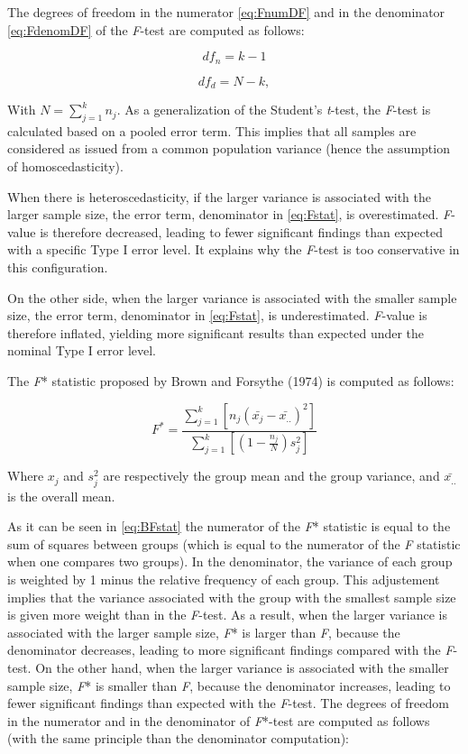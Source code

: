 \documentclass[man,floatsintext]{apa6}
\begin{document}
The degrees of freedom in the numerator \eqref{eq:FnumDF} and in the
denominator \eqref{eq:FdenomDF} of the \emph{F}-test are computed as
follows:

\begin{equation} 
df_n=k-1
\label{eq:FnumDF}
\end{equation}

\begin{equation} 
df_d= N-k, 
\label{eq:FdenomDF}
\end{equation}

With \(N=\sum_{j=1}^k n_j\). As a generalization of the Student's
\emph{t}-test, the \emph{F}-test is calculated based on a pooled error
term. This implies that all samples are considered as issued from a
common population variance (hence the assumption of homoscedasticity).

When there is heteroscedasticity, if the larger variance is associated
with the larger sample size, the error term, denominator in
\eqref{eq:Fstat}, is overestimated. \emph{F}-value is therefore decreased,
leading to fewer significant findings than expected with a specific Type
I error level. It explains why the \emph{F}-test is too conservative in
this configuration.

On the other side, when the larger variance is associated with the
smaller sample size, the error term, denominator in \eqref{eq:Fstat}, is
underestimated. \emph{F}-value is therefore inflated, yielding more
significant results than expected under the nominal Type I error level.

The \emph{F}* statistic proposed by Brown and Forsythe (1974) is
computed as follows:

\begin{equation} 
F^*= \frac{\sum_{j=1}^k[n_j(\bar{x_j}-\bar{x_{..}})^2]}{\sum_{j=1}^k [(1-\frac{n_j}{N})s_j^2]}
\label{eq:BFstat}
\end{equation}

Where \(x_j\) and \(s_j^2\) are respectively the group mean and the
group variance, and \(\bar{x_{..}}\) is the overall mean.

As it can be seen in \eqref{eq:BFstat} the numerator of the \emph{F}*
statistic is equal to the sum of squares between groups (which is equal
to the numerator of the \emph{F} statistic when one compares two
groups). In the denominator, the variance of each group is weighted by 1
minus the relative frequency of each group. This adjustement implies
that the variance associated with the group with the smallest sample
size is given more weight than in the \emph{F}-test. As a result, when
the larger variance is associated with the larger sample size, \emph{F}*
is larger than \emph{F}, because the denominator decreases, leading to
more significant findings compared with the \emph{F}-test. On the other
hand, when the larger variance is associated with the smaller sample
size, \emph{F}* is smaller than \emph{F}, because the denominator
increases, leading to fewer significant findings than expected with the
\emph{F}-test. The degrees of freedom in the numerator and in the
denominator of \emph{F}*-test are computed as follows (with the same
principle than the denominator computation):
\end{document}
